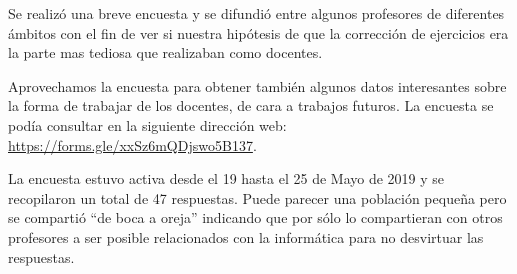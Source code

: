 Se realizó una breve encuesta y se difundió entre algunos profesores de diferentes ámbitos con el fin de ver si nuestra hipótesis de que la corrección de ejercicios era la parte mas tediosa que realizaban como docentes.

\bigskip
Aprovechamos la encuesta para obtener también algunos datos interesantes sobre la forma de trabajar de los docentes, de cara a trabajos futuros. La encuesta se podía consultar en la siguiente dirección web: \url{https://forms.gle/xxSz6mQDjswo5B137}.

\bigskip
La encuesta estuvo activa desde el 19 hasta el 25 de Mayo de 2019 y se recopilaron un total de 47 respuestas. Puede parecer una población pequeña pero se compartió ``de boca a oreja'' indicando que por sólo lo compartieran con otros profesores a ser posible relacionados con la informática para no desvirtuar las respuestas.


